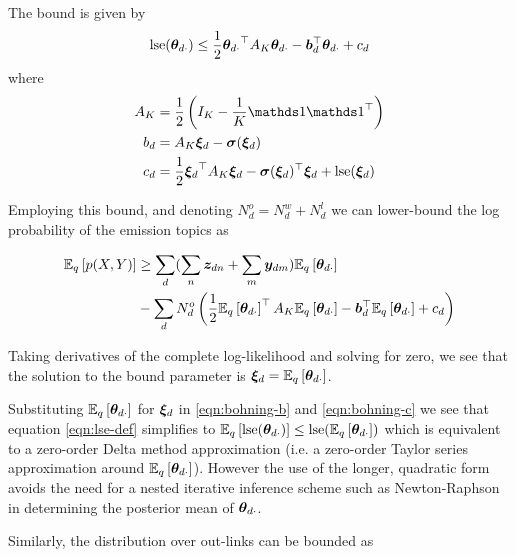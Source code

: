 The bound is given by
\begin{align}
\lse(\thdo) \leq \half \thdo\T A_K \thdo - \vv{b}_d\T\thdo + c_d \label{eqn:lse-def}
\end{align}
where
\begin{align}
A_K & = \half \left( I_K - \frac{1}{K} \one \one\T \right) \\
b_d & = A_K \Ed - \vv{\sigma}(\Ed) \label{eqn:bohning-b} \\
c_d & = \frac{1}{2} \Ed\T A_K \Ed - \vv{\sigma}(\Ed)\T\Ed + \lse(\Ed) \label{eqn:bohning-c}
\end{align}

Employing this bound, and denoting $N^o_d = N^w_d + N^l_d$ we can lower-bound the log probability of the emission topics as

\begin{equation}
\begin{aligned}
\ex{p(X,Y)}{q} & \geq \sum_d  (\sum_n \vv{z}_{dn} + \sum_m \vv{y}_{dm}) \ex{\thdo}{q} \\
   & - \sum_d N^o_d \left(\half \ex{\thdo}{q}\T A_K \ex{\thdo}{q} - \vv{b}_d\T\ex{\thdo}{q} + c_d\right)
\end{aligned}
\end{equation}

Taking derivatives of the complete log-likelihood and solving for zero, we see that the solution to the bound parameter is $\Ed = \ex{\thdo}{q}$. 

Substituting $\ex{\thdo}{q}$ for $\Ed$ in \eqref{eqn:bohning-b} and \eqref{eqn:bohning-c} we see that equation \eqref{eqn:lse-def} simplifies to $\ex{\lse(\thdo)}{q} \leq \lse(\ex{\thdo}{q})$ which is equivalent to a zero-order Delta method approximation (i.e. a zero-order Taylor series approximation around $\ex{\thdo}{q}$). However the use of the longer, quadratic form avoids the need for a nested iterative inference scheme such as Newton-Raphson in determining the posterior mean of $\thdo$.

Similarly, the distribution over out-links can be bounded as

